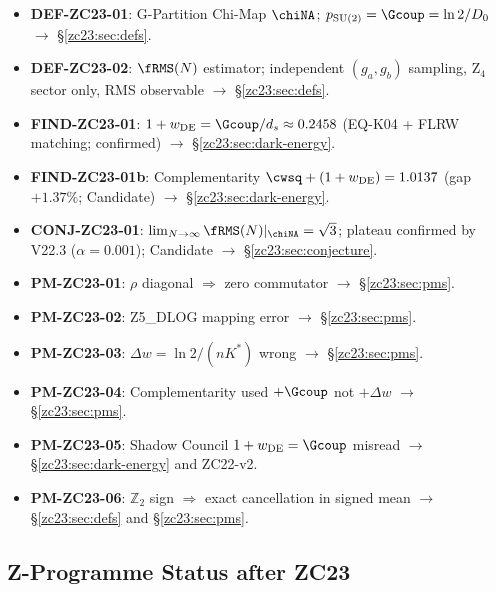 \documentclass[12pt, a4paper]{article}
\begin{document}
\begin{formalbox}[title={Atomic Units Introduced by TASK-ZC23 (11 units)}]
\begin{itemize}[leftmargin=*, noitemsep]
  \item \textbf{DEF-ZC23-01}: G-Partition Chi-Map $\chiNA$;
    $p_{\rm SU(2)} = \Gcoup = \ln 2/D_0$ $\to$ \S\ref{zc23:sec:defs}.
  \item \textbf{DEF-ZC23-02}: $\fRMS(N)$ estimator;
    independent $(g_a,g_b)$ sampling, Z$_4$ sector only, RMS observable
    $\to$ \S\ref{zc23:sec:defs}.
  \item \textbf{FIND-ZC23-01}: $1+w_{\rm DE} = \Gcoup/d_s \approx 0.2458$
    (EQ-K04 + FLRW matching; confirmed)
    $\to$ \S\ref{zc23:sec:dark-energy}.
  \item \textbf{FIND-ZC23-01b}: Complementarity
    $\cwsq + (1+w_{\rm DE}) = 1.0137$ (gap $+1.37\%$; Candidate)
    $\to$ \S\ref{zc23:sec:dark-energy}.
  \item \textbf{CONJ-ZC23-01}: $\lim_{N\to\infty}\fRMS(N)|_{\chiNA}=\sqrt{3}$;
    plateau confirmed by V22.3 ($\alpha=0.001$); Candidate
    $\to$ \S\ref{zc23:sec:conjecture}.
  \item \textbf{PM-ZC23-01}: $\rho$ diagonal $\Rightarrow$ zero commutator
    $\to$ \S\ref{zc23:sec:pms}.
  \item \textbf{PM-ZC23-02}: Z5\_DLOG mapping error
    $\to$ \S\ref{zc23:sec:pms}.
  \item \textbf{PM-ZC23-03}: $\Delta w = \ln2/(nK^*)$ wrong
    $\to$ \S\ref{zc23:sec:pms}.
  \item \textbf{PM-ZC23-04}: Complementarity used $+\Gcoup$ not $+\Delta w$
    $\to$ \S\ref{zc23:sec:pms}.
  \item \textbf{PM-ZC23-05}: Shadow Council $1+w_{\rm DE}=\Gcoup$ misread
    $\to$ \S\ref{zc23:sec:dark-energy} and ZC22-v2.
  \item \textbf{PM-ZC23-06}: $\mathbb{Z}_2$ sign $\Rightarrow$ exact cancellation
    in signed mean $\to$ \S\ref{zc23:sec:defs} and \S\ref{zc23:sec:pms}.
\end{itemize}
\end{formalbox}

\subsection{Z-Programme Status after ZC23}
\label{zc23:sec:status}
\end{document}
